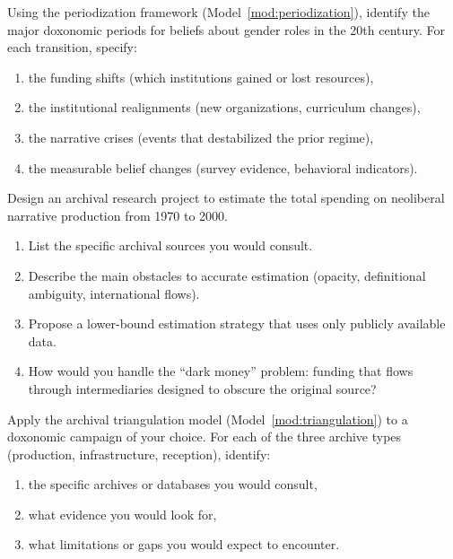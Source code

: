 \begin{exercise}
Using the periodization framework (Model~\ref{mod:periodization}), identify the major doxonomic periods for beliefs about gender roles in the 20th century.
For each transition, specify:
\begin{enumerate}[nosep]
  \item the funding shifts (which institutions gained or lost resources),
  \item the institutional realignments (new organizations, curriculum changes),
  \item the narrative crises (events that destabilized the prior regime),
  \item the measurable belief changes (survey evidence, behavioral indicators).
\end{enumerate}
\end{exercise}

\begin{exercise}
Design an archival research project to estimate the total spending on neoliberal narrative production from 1970 to 2000.
\begin{enumerate}[nosep]
  \item List the specific archival sources you would consult.
  \item Describe the main obstacles to accurate estimation (opacity, definitional ambiguity, international flows).
  \item Propose a lower-bound estimation strategy that uses only publicly available data.
  \item How would you handle the ``dark money'' problem: funding that flows through intermediaries designed to obscure the original source?
\end{enumerate}
\end{exercise}

\begin{exercise}
Apply the archival triangulation model (Model~\ref{mod:triangulation}) to a doxonomic campaign of your choice.
For each of the three archive types (production, infrastructure, reception), identify:
\begin{enumerate}[nosep]
  \item the specific archives or databases you would consult,
  \item what evidence you would look for,
  \item what limitations or gaps you would expect to encounter.
\end{enumerate}
\end{exercise}

